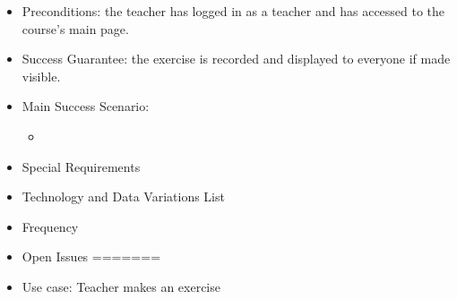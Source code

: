 \documentclass{article}
\begin{document}
\begin{enumerate}
\begin{enumerate}
\begin{enumerate}
\begin{itemize}
				\item Preconditions: the teacher has logged in as a teacher and has accessed to the course's main page.
				\item Success Guarantee: the exercise is recorded and displayed to everyone if made visible.
				\item Main Success Scenario:
					\begin{itemize}
						\item 
					\end{itemize}
				\item Special Requirements
				\item Technology and Data Variations List
				\item Frequency
				\item Open Issues
=======
		
		
			\item{Use case: Teacher makes an exercise}
						

\end{itemize}
\end{enumerate}
\end{enumerate}
\end{enumerate}
\end{document}
